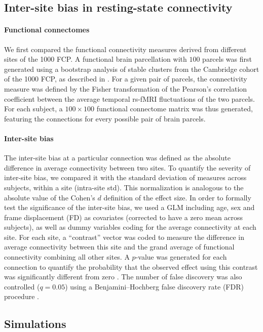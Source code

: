 \documentclass[authoryear]{elsarticle}
\begin{document}
\subsection{Inter-site bias in resting-state connectivity}
\paragraph{Functional connectomes} We first compared the functional connectivity measures derived from different sites of the 1000 FCP. A functional brain parcellation with $100$ parcels was first generated using a bootstrap analysis of stable clusters \citep{Bellec2010c} from the Cambridge cohort of the 1000 FCP, as described in \cite{Orban2015}. For a given pair of parcels, the connectivity measure was defined by the Fisher transformation of the Pearson's correlation coefficient between the average temporal rs-fMRI fluctuations of the two parcels. For each subject, a $100 \times 100$ functional connectome matrix was thus generated, featuring the connections for every possible pair of brain parcels. 

\paragraph{Inter-site bias} The inter-site bias at a particular connection was defined as the absolute difference in average connectivity between two sites. To quantify the severity of inter-site bias, we compared it with the standard deviation of measures across subjects, within a site (intra-site std). This normalization is analogous to the absolute value of the Cohen's $d$ definition of the effect size. In order to formally test the significance of the inter-site bias, we used a GLM including age, sex and frame displacement (FD) as covariates (corrected to have a zero mean across subjects), as well as dummy variables coding for the average connectivity at each site. For each site, a ``contrast'' vector was coded to measure the difference in average connectivity between this site and the grand average of functional connectivity combining all other sites. A $p$-value was generated for each connection to quantify the probability that the observed effect using this contrast was significantly different from zero \citep{Worsley1995}. The number of false discovery was also controlled ($q=0.05$) using a Benjamini–Hochberg false discovery rate (FDR) procedure \citep{Benjamini1995}.


\subsection{Simulations}
\end{document}
